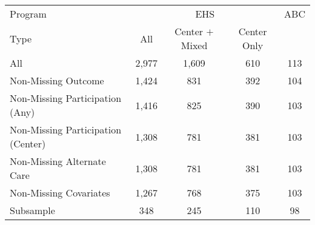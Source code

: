 \begin{tabular}{lcccc}
\toprule 
\midrule 
Program & \multicolumn{3}{c}{EHS} & ABC \\
 \cmidrule(lr){1-1} \cmidrule(lr){2-4} \cmidrule(lr){5-5} 
Type & All & Center $+$ Mixed & Center Only &  \\
\midrule 
All & 2,977 & 1,609 & 610 & 113 \\
Non-Missing Outcome & 1,424 & 831 & 392 & 104 \\
Non-Missing Participation (Any) & 1,416 & 825 & 390 & 103 \\
Non-Missing Participation (Center) & 1,308 & 781 & 381 & 103 \\
Non-Missing Alternate Care & 1,308 & 781 & 381 & 103 \\
Non-Missing Covariates & 1,267 & 768 & 375 & 103 \\
Subsample & 348 & 245 & 110 & 98 \\
\midrule 
\bottomrule 
\end{tabular}
